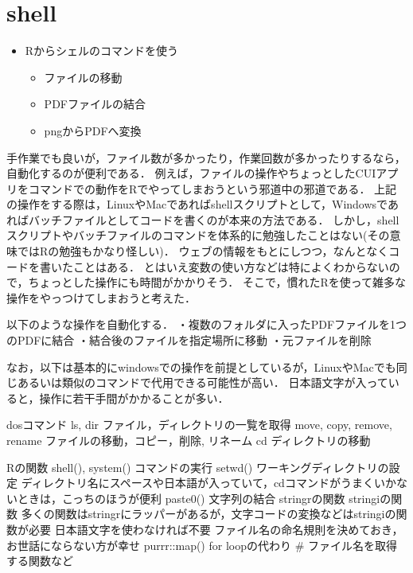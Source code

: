 \documentclass[
]{article}
\providecommand{\tightlist}{%
  \setlength{\itemsep}{0pt}\setlength{\parskip}{0pt}}
\begin{document}
\hypertarget{shell}{%
\section{shell}\label{shell}}

\begin{itemize}
\tightlist
\item
  Rからシェルのコマンドを使う

  \begin{itemize}
  \tightlist
  \item
    ファイルの移動\\
  \item
    PDFファイルの結合\\
  \item
    pngからPDFへ変換
  \end{itemize}
\end{itemize}

手作業でも良いが，ファイル数が多かったり，作業回数が多かったりするなら，自動化するのが便利である．
例えば，ファイルの操作やちょっとしたCUIアプリをコマンドでの動作をRでやってしまおうという邪道中の邪道である．
上記の操作をする際は，LinuxやMacであればshellスクリプトとして，Windowsであればバッチファイルとしてコードを書くのが本来の方法である．
しかし，shellスクリプトやバッチファイルのコマンドを体系的に勉強したことはない(その意味ではRの勉強もかなり怪しい)．
ウェブの情報をもとにしつつ，なんとなくコードを書いたことはある．
とはいえ変数の使い方などは特によくわからないので，ちょっとした操作にも時間がかかりそう．
そこで，慣れたRを使って雑多な操作をやっつけてしまおうと考えた．

以下のような操作を自動化する．
・複数のフォルダに入ったPDFファイルを1つのPDFに結合
・結合後のファイルを指定場所に移動
・元ファイルを削除

なお，以下は基本的にwindowsでの操作を前提としているが，LinuxやMacでも同じあるいは類似のコマンドで代用できる可能性が高い．
日本語文字が入っていると，操作に若干手間がかかることが多い．

dosコマンド
ls, dir
ファイル，ディレクトリの一覧を取得
move, copy, remove, rename
ファイルの移動，コピー，削除, リネーム
cd
ディレクトリの移動

Rの関数
shell(), system()
コマンドの実行
setwd()
ワーキングディレクトリの設定
ディレクトリ名にスペースや日本語が入っていて，cdコマンドがうまくいかないときは，こっちのほうが便利
paste0()
文字列の結合
stringrの関数
stringiの関数
多くの関数はstringrにラッパーがあるが，文字コードの変換などはstringiの関数が必要
日本語文字を使わなければ不要
ファイル名の命名規則を決めておき，お世話にならない方が幸せ
purrr::map()
for loopの代わり
\# ファイル名を取得する関数など
\end{document}
